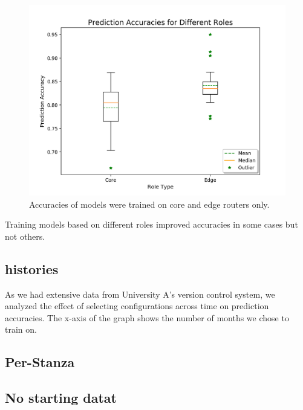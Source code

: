 \begin{figure}[H]
	\centering
	\includegraphics[width=\textwidth]{roles.png}
	\caption{Accuracies of models were trained on core and edge routers only.}
\end{figure}

Training models based on different roles improved accuracies in some cases but not others.

\subsection{histories}

As we had extensive data from University A's version control system, we analyzed the effect of selecting configurations across time on prediction accuracies. The x-axis of the graph shows the number of months we chose to train on.

\subsection{Per-Stanza}

\subsection{No starting datat}
